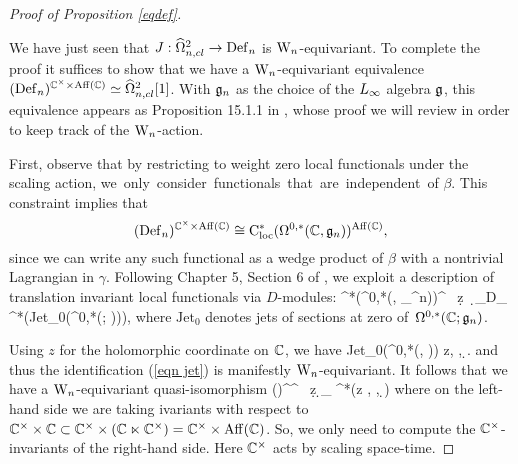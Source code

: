 \begin{proof}[Proof of Proposition \ref{eqdef}]
\label{seceqdef}

We have just seen that $J : \widehat{\Omega}^2_{n,cl} \to {\rm Def}_n$ is
${{\rm W}_n}$-equivariant. To complete the proof it suffices to show that we have a ${{\rm W}_n}$-equivariant equivalence $({\rm Def}_n)^{\mathbb C^\times \times {\rm
    Aff}(\mathbb C)} \simeq \widehat{\Omega}^2_{n,cl}[1]$. With $\mathfrak{g}_n$ as the choice of the $\L8$ algebra $\mathfrak g$, 
this equivalence appears as Proposition 15.1.1 in \cite{WG2},
whose proof we will review in order to keep track of the ${{\rm W}_n}$-action. 

First, observe that by restricting to weight zero local functionals under the scaling action, \si 
we only consider functionals that are independent of $\beta$. 
This constraint implies that 
\[
({\rm Def}_n)^{\mathbb C^\times \times {\rm Aff}(\mathbb C)} \cong {\rm C}^*_{\rm loc}(\Omega^{0,*}(\mathbb C, \mathfrak{g}_n))^{{\rm Aff}(\mathbb C)},
\] 
since we can write any such functional as a wedge product of $\beta$ with a nontrivial Lagrangian in $\gamma$.
Following Chapter 5, Section 6 of \cite{CosBook}, we exploit a
description of translation invariant local functionals via $D$-modules:
\be\label{eqn jet}
\Cloc^*\left(\Omega^{0,*}(\CC, \fg_{\hD^n})\right)^\CC 
\cong \CC \, \d z \, \d \zbar \otimes_{D_{\CC}} \Cred^*\left({\rm Jet}_0(\Omega^{0,*}(\CC ; \fgn))\right),
\ee
where $\text{Jet}_0$ denotes jets of sections at zero of~$\Omega^{0,*}(\mathbb C ; \mathfrak g_n)$. 

Using $z$ for the holomorphic coordinate on $\mathbb C$, we have
\ben
{\rm Jet}_0(\Omega^{0,*}(\CC, \fgn)) \cong \fgn \llbracket z, \zbar, \d \zbar \rrbracket.
\een 
and thus the identification (\ref{eqn jet}) is manifestly ${{\rm W}_n}$-equivariant. 
It follows that we have a ${{\rm W}_n}$-equivariant quasi-isomorphism
\ben
(\Def)^{\CC^\times \times \CC} \simeq \CC\, \d z \wedge \d \zbar \otimes_{} \Cred^*(\fgn\llbracket z , \zbar, \d \zbar \rrbracket)
\een
where on the left-hand side we are taking ivariants with respect to $\mathbb C^\times \times \mathbb C \subset \mathbb C^\times \times (\mathbb C \ltimes \mathbb C^\times) = \mathbb C^\times \times {\rm Aff}(\mathbb C)$. So, we only need to compute the $\mathbb C^\times$-invariants of the right-hand side. Here $\mathbb C^\times$ acts by scaling space-time.


\end{proof}
